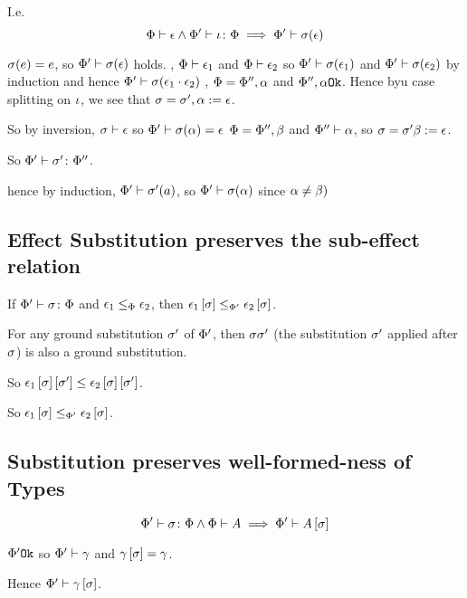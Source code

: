 {    I.e. \begin{equation}
        \wellformed{\P}{\e}\wedge\typerelation{\P'}{\i}{\P} \implies \wellformed{\P'}{\si(\e)}
    \end{equation}

    \proof
    $\si(e) = e$, so $\wellformed{\P'}{\si(\e)}$ holds.
    \bi, $\wellformed{\P}{\e_1}$ and $\wellformed{\P}{\e_2}$ so $\wellformed{\P'}{\si(\e_1)}$ and $\wellformed{\P'}{\si(\e_2)}$ by induction and hence $\wellformed{\P'}{\si(\e_1\dot\e_2)}$
    \bi, $\P=\P'',\a$ and $\ok{\P'',\a}$. Hence byu case splitting on $\i$, we see that $\si=\si', \a\setto\e$.

    So by inversion, $\wellformed{\si}{\e}$ so $\wellformed{\P'}{\si(\a)=\e}$
    \bi $\P=\P'', \b$ and $\wellformed{\P''}{\a}$, so $\si=\si'\b\setto\e$.

    So $\typerelation{\P'}{\si'}{\P''}$.

    hence by induction, $\wellformed{\P'}{\si'(a)}$, so $\wellformed{\P'}{\si(\a)}$ since $\a\neq\b)$

    \subsection{Effect Substitution preserves the sub-effect relation}

    If $\typerelation{\P'}{\si}{\P}$ and $\e_1\subeffectp\e_2$, then $\e_1\ssi\subeffect_{\P'}\e_2\ssi$.

    \proof
    For any ground substitution $\si'$ of $\P'$, then $\si\si'$ (the substitution $\si'$ applied after $\si$) is also a ground substitution.
    
    So $\e_1\ssi\sub{\si'}\subeffect\e_2\ssi\sub{\si'}$. 
    
    So $\e_1\ssi\subeffect_{\P'}\e_2\ssi$.

    \subsection{Substitution preserves well-formed-ness of Types}
    \begin{equation}
        \typerelation{\P'}{\si}{\P} \wedge \wellformed{\P}{A} \implies \wellformed{\P'}{A\ssi}
    \end{equation}
    \proof

    $\ok{\P'}$ so $\wellformed{\P'}{\g}$ and $\g\ssi=\g$.

    Hence $\wellformed{\P'}{\g\ssi}$.

}
